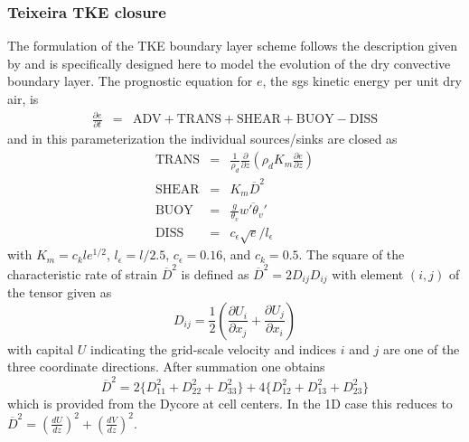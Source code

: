 \documentclass[dvipdfmx,a4paper,10pt]{article}
\begin{document}
% 


\subsubsection{Teixeira TKE closure}
The formulation of the TKE boundary layer scheme follows the description given by \cite{teixeira04} and is specifically designed here to model the evolution of the dry convective boundary layer. The prognostic equation for $e$, the sgs kinetic energy per unit dry air, is
\begin{eqnarray}\label{eqn:tkebudget}
 \frac{\partial e}{\partial t}&=& \mathrm{ADV} + \mathrm{TRANS} + \mathrm{SHEAR} + \mathrm{BUOY} - \mathrm{DISS}
\end{eqnarray}
and in this parameterization the individual sources/sinks are closed as
\begin{eqnarray}
 \mathrm{TRANS} &=& \frac{1}{\rho_d}\frac{\partial}{\partial z} (\rho_d K_m  \frac{\partial e}{\partial z})\\
 \mathrm{SHEAR} &=& K_m \overline{D}^2 \\
 \mathrm{BUOY} &=& \frac{g}{\theta_v}\overline{w'\theta_v'}\\
 \mathrm{DISS}&=& c_{\epsilon}\sqrt{e}/l_{\epsilon}
\end{eqnarray}
with $K_m=c_k l e^{1/2}$, $l_{\epsilon}=l/2.5$, $c_{\epsilon}=0.16$, and $c_k=0.5$. The square of the characteristic rate of strain $\overline{D}^2$ is defined as $\overline{D}^2=2D_{ij}D_{ij}$ with element $(i,j)$ of the tensor given as
\begin{equation}
 D_{ij}=\frac{1}{2}(\frac{\partial U_i}{\partial x_j}+\frac{\partial U_j}{\partial x_i})
\end{equation}
with capital $U$ indicating the grid-scale velocity and indices $i$ and $j$ are one of the three coordinate directions. After summation one obtains 
\begin{equation}\label{eqn:def2}
 \overline{D}^2=2\{D_{11}^2+D_{22}^2+D_{33}^2\}+4\{D_{12}^2+D_{13}^2+D_{23}^2 \}
\end{equation}
which is provided from the Dycore at cell centers. In the 1D case this reduces to $\overline{D}^2=(\frac{dU}{dz})^2+(\frac{dV}{dz})^2$.
\end{document}
